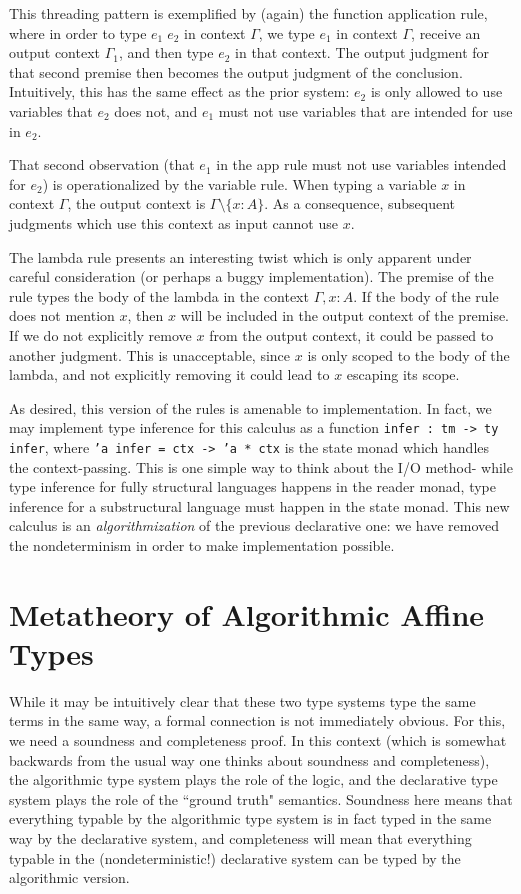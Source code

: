 \documentclass{article}
\theoremstyle{definition}
\begin{document}
This threading pattern is exemplified by (again) the function application rule, where in order to type $e_1 \; e_2$ in context $\Gamma$, we type $e_1$ in context $\Gamma$, receive an output context $\Gamma_1$, and then type $e_2$ in that context. The output judgment for that second premise then becomes the output judgment of the conclusion. Intuitively, this has the same effect as the prior system: $e_2$ is only allowed to use variables that $e_2$ does not, and $e_1$ must not use variables that are intended for use in $e_2$.

That second observation (that $e_1$ in the app rule must not use variables intended for $e_2$) is operationalized by the variable rule. When typing a variable $x$ in context $\Gamma$, the output context is $\Gamma \setminus \{x : A\}$. As a consequence, subsequent judgments which use this context as input cannot use $x$.

The lambda rule presents an interesting twist which is only apparent under careful consideration (or perhaps a buggy implementation). The premise of the rule types the body of the lambda in the context $\Gamma,x : A$. If the body of the rule does not mention $x$, then $x$ will be included in the output context of the premise. If we do not explicitly remove $x$ from the output context, it could be passed to another judgment. This is unacceptable, since $x$ is only scoped to the body of the lambda, and not explicitly removing it could lead to $x$ escaping its scope.

As desired, this version of the rules is amenable to implementation. In fact, we may implement type inference for this calculus as a function \texttt{infer : tm -> ty infer}, where \texttt{'a infer = ctx -> 'a * ctx} is the state monad which handles the context-passing. This is one simple way to think about the I/O method- while type inference for fully structural languages happens in the reader monad, type inference for a substructural language must happen in the state monad. This new calculus is an \textit{algorithmization} of the previous declarative one: we have removed the nondeterminism in order to make implementation possible.

\section{Metatheory of Algorithmic Affine Types}
While it may be intuitively clear that these two type systems type the same terms in the same way, a formal connection is not immediately obvious. For this, we need a soundness and completeness proof. In this context (which is somewhat backwards from the usual way one thinks about soundness and completeness), the algorithmic type system plays the role of the logic, and the declarative type system plays the role of the ``ground truth" semantics. Soundness here means that everything typable by the algorithmic type system is in fact typed in the same way by the declarative system, and completeness will mean that everything typable in the (nondeterministic!) declarative system can be typed by the algorithmic version.
\end{document}
